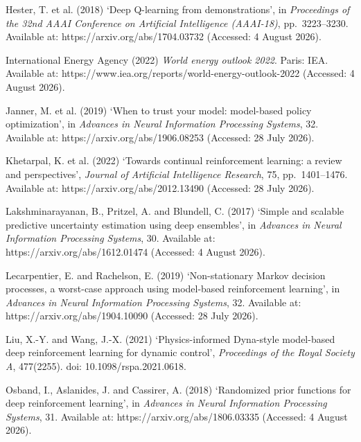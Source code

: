 \documentclass[conference]{IEEEtran}
\begin{document}
\begin{thebibliography}{}
Hester, T. et al. (2018) `Deep Q-learning from demonstrations', in \emph{Proceedings of the 32nd AAAI Conference on Artificial Intelligence (AAAI-18)}, pp.\ 3223--3230. Available at: https://arxiv.org/abs/1704.03732 (Accessed: 4 August 2026).

International Energy Agency (2022) \emph{World energy outlook 2022}. Paris: IEA. Available at: https://www.iea.org/reports/world-energy-outlook-2022 (Accessed: 4 August 2026).

Janner, M. et al. (2019) `When to trust your model: model-based policy optimization', in \emph{Advances in Neural Information Processing Systems}, 32. Available at: https://arxiv.org/abs/1906.08253 (Accessed: 28 July 2026).

Khetarpal, K. et al. (2022) `Towards continual reinforcement learning: a review and perspectives', \emph{Journal of Artificial Intelligence Research}, 75, pp.\ 1401--1476. Available at: https://arxiv.org/abs/2012.13490 (Accessed: 28 July 2026).

Lakshminarayanan, B., Pritzel, A. and Blundell, C. (2017) `Simple and scalable predictive uncertainty estimation using deep ensembles', in \emph{Advances in Neural Information Processing Systems}, 30. Available at: https://arxiv.org/abs/1612.01474 (Accessed: 4 August 2026).

Lecarpentier, E. and Rachelson, E. (2019) `Non-stationary Markov decision processes, a worst-case approach using model-based reinforcement learning', in \emph{Advances in Neural Information Processing Systems}, 32. Available at: https://arxiv.org/abs/1904.10090 (Accessed: 28 July 2026).

Liu, X.-Y. and Wang, J.-X. (2021) `Physics-informed Dyna-style model-based deep reinforcement learning for dynamic control', \emph{Proceedings of the Royal Society A}, 477(2255). doi: 10.1098/rspa.2021.0618.

Osband, I., Aslanides, J. and Cassirer, A. (2018) `Randomized prior functions for deep reinforcement learning', in \emph{Advances in Neural Information Processing Systems}, 31. Available at: https://arxiv.org/abs/1806.03335 (Accessed: 4 August 2026).


\end{thebibliography}
\end{document}
